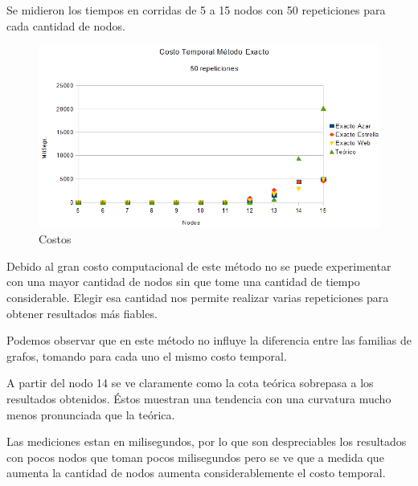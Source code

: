 \quad Se midieron los tiempos en corridas de  5 a 15 nodos con 50 repeticiones para cada cantidad de nodos.

\begin{figure}[H]
	\centering
	\includegraphics[scale=0.8]{timingExacto.png}
\caption{Costos}
\end{figure}

\quad Debido al gran costo computacional de este método no se puede experimentar con una mayor cantidad de nodos sin que tome una cantidad de tiempo considerable. Elegir esa cantidad nos permite realizar varias repeticiones para obtener resultados más fiables.

\quad Podemos observar que en este método no influye la diferencia entre las familias de grafos, tomando para cada uno el mismo costo temporal. 

\quad A partir del nodo 14 se ve claramente como la cota teórica sobrepasa a los resultados obtenidos. Éstos muestran una tendencia con una curvatura mucho menos pronunciada que la teórica.

\quad Las mediciones estan en milisegundos, por lo que son despreciables los resultados con pocos nodos que toman pocos milisegundos pero se ve que a medida que aumenta la cantidad de nodos aumenta considerablemente el costo temporal.
